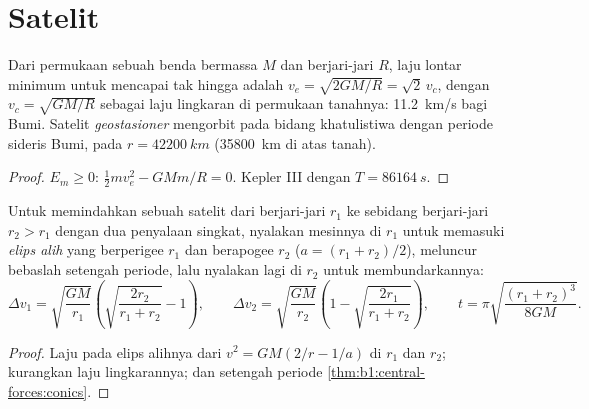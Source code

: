 \section{Satelit}

\begin{proposition}\label{prop:b1:central-forces:escape}
Dari permukaan sebuah benda bermassa $M$ dan berjari-jari $R$, laju
lontar minimum untuk mencapai tak hingga adalah
$v_e = \sqrt{2GM/R} = \sqrt2\,v_c$, dengan $v_c = \sqrt{GM/R}$ sebagai
laju lingkaran di permukaan tanahnya: \qty{11.2}{km/s} bagi Bumi.
Satelit \emph{geostasioner} mengorbit pada bidang khatulistiwa dengan
periode sideris Bumi, pada $r = \qty{42200}{km}$ (\qty{35800}{km} di
atas tanah).
\end{proposition}

\begin{proof}
$E_m \geq 0$: $\tfrac12 mv_e^2 - GMm/R = 0$. Kepler III dengan $T = \qty{86164}{s}$.
\end{proof}

\begin{proposition}\label{prop:b1:central-forces:hohmann}
Untuk memindahkan sebuah satelit dari  berjari-jari $r_1$
ke  sebidang berjari-jari $r_2 > r_1$ dengan dua
penyalaan singkat, nyalakan mesinnya di $r_1$ untuk memasuki \emph{elips
alih} yang berperigee $r_1$ dan berapogee $r_2$ ($a = (r_1 + r_2)/2$),
meluncur bebaslah setengah periode, lalu nyalakan lagi di $r_2$ untuk
membundarkannya:
\[
\Delta v_1 = \sqrt{\frac{GM}{r_1}}\left(\sqrt{\frac{2r_2}{r_1 + r_2}} - 1\right),
\qquad
\Delta v_2 = \sqrt{\frac{GM}{r_2}}\left(1 - \sqrt{\frac{2r_1}{r_1 + r_2}}\right),
\qquad
t = \pi\sqrt{\frac{(r_1 + r_2)^3}{8GM}} .
\]
\end{proposition}

\begin{proof}
Laju pada elips alihnya dari $v^2 = GM(2/r - 1/a)$ di $r_1$ dan $r_2$;
kurangkan laju lingkarannya; dan setengah periode
\cref{thm:b1:central-forces:conics}.
\end{proof}

